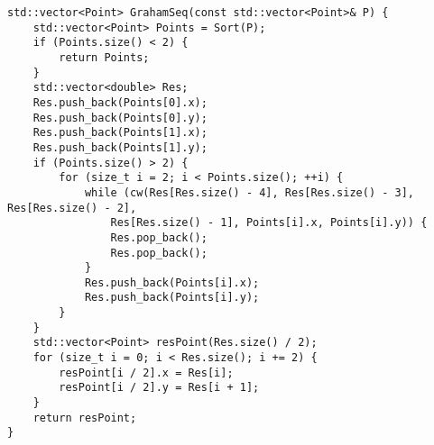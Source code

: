 \documentclass{report}
\begin{document}
\begin{lstlisting}
std::vector<Point> GrahamSeq(const std::vector<Point>& P) {
    std::vector<Point> Points = Sort(P);
    if (Points.size() < 2) {
        return Points;
    }
    std::vector<double> Res;
    Res.push_back(Points[0].x);
    Res.push_back(Points[0].y);
    Res.push_back(Points[1].x);
    Res.push_back(Points[1].y);
    if (Points.size() > 2) {
        for (size_t i = 2; i < Points.size(); ++i) {
            while (cw(Res[Res.size() - 4], Res[Res.size() - 3], Res[Res.size() - 2],
                Res[Res.size() - 1], Points[i].x, Points[i].y)) {
                Res.pop_back();
                Res.pop_back();
            }
            Res.push_back(Points[i].x);
            Res.push_back(Points[i].y);
        }
    }
    std::vector<Point> resPoint(Res.size() / 2);
    for (size_t i = 0; i < Res.size(); i += 2) {
        resPoint[i / 2].x = Res[i];
        resPoint[i / 2].y = Res[i + 1];
    }
    return resPoint;
}


\end{lstlisting}
\end{document}
